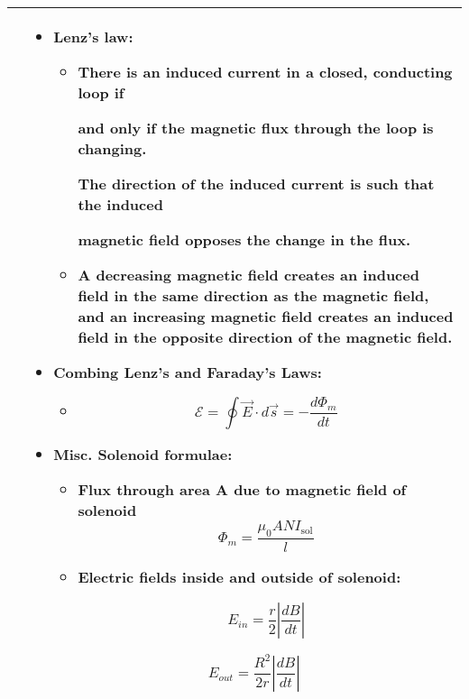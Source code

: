 \documentclass{article}
\begin{document}
\begin{center}
\begin{longtable}{|p{9cm}|p{9cm}|}
		                &



		\begin{itemize}



			\item Lenz's law:

			      \begin{itemize}

				      \item There is an induced current in a closed, conducting loop if

				            and only if the magnetic flux through the loop is changing.

				            The direction of the induced current is such that the induced

				            magnetic field opposes the change in the flux.

				      \item A decreasing magnetic field creates an induced field in the same direction as the magnetic field, and an increasing magnetic field creates an induced field in the opposite direction of the magnetic field.

			      \end{itemize}

			\item Combing Lenz's and Faraday's Laws:

			      \begin{itemize}

				      \item  \[ \mathcal{E} = \oint \vec{E} \cdot d\vec{s} = -\frac{d\Phi_m}{dt}\]

			      \end{itemize}



			\item Misc. Solenoid formulae:

			      \begin{itemize}

				      \item Flux through area A due to magnetic field of solenoid\[ \Phi_m = \frac{\mu_0 A N I_\text{sol}}{l} \]

				      \item Electric fields inside and outside of solenoid:

				            \[E_{in} = \frac{r}{2}\left\lvert \frac{dB}{dt} \right\rvert \]

			      \end{itemize}

			      \[E_{out} = \frac{R^2}{2r}\left\lvert \frac{dB}{dt} \right\rvert \]



		\end{itemize} \\

		\hline

	\end{longtable}



\end{center}
\end{document}
